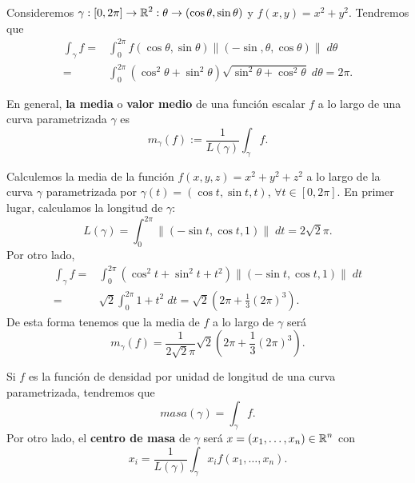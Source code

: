 \begin{eg}
	Consideremos $\displaystyle \gamma : \left[0,2\pi \right] \to \mathbb{R}^{2} : \theta \to \left(\cos\theta, \sin \theta\right) $ y $\displaystyle f\left(x,y\right)=x^{2}+y^{2} $. Tendremos que 
	\[
	\begin{split}
		\int _{\gamma }f = &\int^{2\pi }_{0} f\left(\cos \theta, \sin \theta\right) \|\left(-\sin, \theta, \cos\theta\right)\| \; d\theta \\
		= & \int^{2\pi }_{0} \left(\cos^{2}\theta+\sin ^{2}\theta\right) \sqrt{\sin ^{2}\theta + \cos^{2}\theta}\; d\theta = 2\pi .
	\end{split}
	\]
\end{eg}
\begin{definition}
En general, \textbf{la media} o \textbf{valor medio} de una función escalar $\displaystyle f $ a lo largo de una curva parametrizada $\displaystyle \gamma  $ es
\[m_{\gamma }\left(f\right):=\frac{1}{L\left(\gamma \right)}\int _{\gamma }f  .\]
\end{definition}
\begin{eg}
	Calculemos la media de la función $\displaystyle f\left(x,y,z\right)=x^{2}+y^{2}+z^{2} $ a lo largo de la curva $\displaystyle \gamma  $ parametrizada por $\displaystyle \gamma\left(t\right)=\left(\cos t, \sin t, t\right) $, $\displaystyle \forall t \in \left[0,2\pi \right]  $. En primer lugar, calculamos la longitud de $\displaystyle \gamma  $:
	\[L\left(\gamma \right)=\int^{2\pi }_{0} \|\left(-\sin t, \cos t, 1\right)\| \; dt = 2\sqrt{2}\pi  .\]
	Por otro lado,
	\[
	\begin{split}
		\int _{\gamma }f = & \int^{2\pi }_{0} \left(\cos ^{2}t + \sin ^{2}t + t ^{2}\right) \|\left(- \sin t, \cos t, 1\right)\| \; dt \\
		= &  \sqrt{2}\int^{2\pi }_{0} 1 + t ^{2} \; dt = \sqrt{2}\left(2\pi + \frac{1}{3}\left(2\pi \right)^{3}\right) .
	\end{split}
	\]
	De esta forma tenemos que la media de $\displaystyle f $ a lo largo de $\displaystyle \gamma  $ será
	\[m_{\gamma }\left(f\right)=\frac{1}{2\sqrt{2}\pi } \sqrt{2}\left(2\pi + \frac{1}{3}\left(2\pi \right)^{3}\right).\]	
\end{eg}
\begin{definition}
Si $\displaystyle f $ es la función de densidad por unidad de longitud de una curva parametrizada, tendremos que 
\[masa\left(\gamma \right)=\int _{\gamma }f  .\]
Por otro lado, el \textbf{centro de masa} de $\displaystyle \gamma  $ será $\displaystyle x = \left(x_{1} , \ldots, x_{n}\right)\in \mathbb{R}^{n} $ con 
\[x_{i}=\frac{1}{L\left(\gamma \right)}\int _{\gamma }x_{i}f\left(x_{1}, \ldots, x_{n}\right) .\]
\end{definition}

